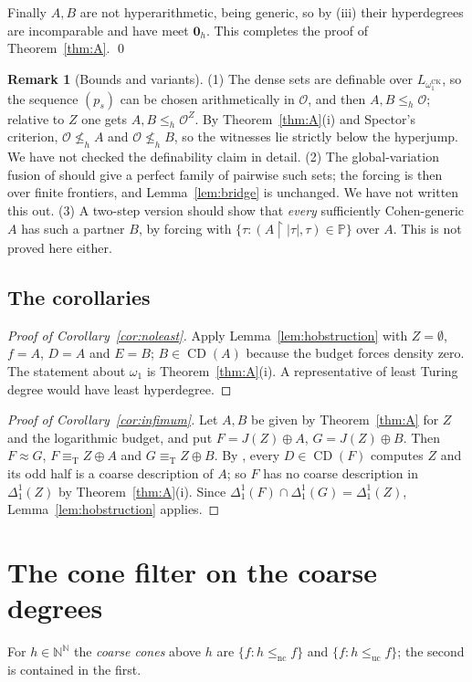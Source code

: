 \documentclass[11pt,letterpaper]{article}
\theoremstyle{definition}
\newtheorem{remark}[definition]{Remark}
\numberwithin{equation}{section}
\newcommand{\N}{\mathbb N}
\newcommand{\Baire}{\N^{\N}}
\newcommand{\eqT}{\equiv_{\mathrm T}}
\newcommand{\lenc}{\le_{\mathrm{nc}}}
\newcommand{\leuc}{\le_{\mathrm{uc}}}
\newcommand{\CD}{\operatorname{CD}}
\newcommand{\J}{J}
\newcommand{\rest}{\mathbin{\upharpoonright}}
\newcommand{\zero}{\mathbf 0}
\newcommand{\leh}{\le_{h}}
\newcommand{\nleh}{\nleq_{h}}
\newcommand{\Dh}{\Delta^1_1}
\newcommand{\omck}{\omega_1^{\mathrm{CK}}}
\newcommand{\KO}{\mathcal O}
\newcommand{\PP}{\mathbb P}
\begin{document}
Finally $A,B$ are not hyperarithmetic, being generic, so by (iii) their hyperdegrees are incomparable and have meet $\zero_h$. This completes the proof of Theorem~\ref{thm:A}. \qed

\begin{remark}[Bounds and variants]\label{rem:variants}
(1) The dense sets are definable over $L_{\omck}$, so the sequence $(p_s)$ can be chosen arithmetically in $\KO$, and then $A,B\leh\KO$; relative to $Z$ one gets $A,B\leh\KO^Z$. By Theorem~\ref{thm:A}(i) and Spector's criterion, $\KO\nleh A$ and $\KO\nleh B$, so the witnesses lie strictly below the hyperjump. We have not checked the definability claim in detail. (2) The global-variation fusion of \cite[Theorem~8.7]{Synthesis} should give a perfect family of pairwise such sets; the forcing is then over finite frontiers, and Lemma~\ref{lem:bridge} is unchanged. We have not written this out. (3) A two-step version should show that \emph{every} sufficiently Cohen-generic $A$ has such a partner $B$, by forcing with $\{\tau:(A\rest|\tau|,\tau)\in\PP\}$ over $A$. This is not proved here either.
\end{remark}

\subsection{The corollaries}
\begin{proof}[Proof of Corollary~\ref{cor:noleast}]
Apply Lemma~\ref{lem:hobstruction} with $Z=\emptyset$, $f=A$, $D=A$ and $E=B$; $B\in\CD(A)$ because the budget forces density zero. The statement about $\omega_1$ is Theorem~\ref{thm:A}(i). A representative of least Turing degree would have least hyperdegree.
\end{proof}
\begin{proof}[Proof of Corollary~\ref{cor:infimum}]
Let $A,B$ be given by Theorem~\ref{thm:A} for $Z$ and the logarithmic budget, and put $F=\J(Z)\oplus A$, $G=\J(Z)\oplus B$. Then $F\approx G$, $F\eqT Z\oplus A$ and $G\eqT Z\oplus B$. By \cite[Lemma~9.1]{Synthesis}, every $D\in\CD(F)$ computes $Z$ and its odd half is a coarse description of $A$; so $F$ has no coarse description in $\Dh(Z)$ by Theorem~\ref{thm:A}(i). Since $\Dh(F)\cap\Dh(G)=\Dh(Z)$, Lemma~\ref{lem:hobstruction} applies.
\end{proof}

\section{The cone filter on the coarse degrees}\label{sec:D}
For $h\in\Baire$ the \emph{coarse cones} above $h$ are $\{f:h\lenc f\}$ and $\{f:h\leuc f\}$; the second is contained in the first.
\end{document}
